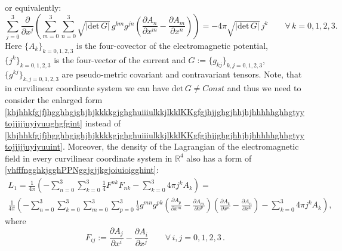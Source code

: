 \documentclass{article}
\theoremstyle{definition}
\theoremstyle{remark}
\newcommand{\er}{\eqref}
\newcommand{\er}{\eqref}
\begin{document}
or equivalently:
\begin{equation}\label{khjhhkfgjfjhgghhgjghjhjkkkkgjghghuiiiulkkjlkklKKgfgjhjjghgjhhjhjhhhhhghhgtyytojjjjjuyiyuughgfghhjkkhjint}
\sum_{j=0}^{3}\frac{\partial}{\partial
x^j}\left(\sum_{m=0}^{3}\sum_{n=0}^{3}\sqrt{|\text{det}\,G|}\,g^{km}g^{jn}\left(\frac{\partial
A_n}{\partial x^m}-\frac{\partial A_m}{\partial x^n}\right)\right)
=-4\pi \sqrt{|\text{det}\,G|}\, j^k\quad\quad\forall\, k=0,1,2,3.
\end{equation}
Here $\{A_k\}_{k=0,1,2,3}$ is the four-covector of the
electromagnetic potential, $\{j^k\}_{k=0,1,2,3}$ is the four-vector
of the current and $G:=\{g_{kj}\}_{k,j=0,1,2,3}$,
$\{g^{kj}\}_{k,j=0,1,2,3}$ are pseudo-metric covariant and
contravariant tensors. Note, that in curvilinear coordinate system
we can have $\text{det}\,G\neq Const$ and thus we need to consider
the enlarged form
\er{khjhhkfgjfjhgghhgjghjhjkkkkgjghghuiiiulkkjlkklKKgfgjhjjghgjhhjhjhhhhhghhgtyytojjjjjuyiyuughgfgint}
instead of
\er{khjhhkfgjfjhgghhgjghjhjkkkkgjghghuiiiulkkjlkklKKgfgjhjjghgjhhjhjhhhhhghhgtyytojjjjjuyiyuuint}.
Moreover, the density of the Lagrangian of the electromagnetic field
in every curvilinear coordinate system in $\mathbb{R}^4$ also has a
form of \er{vhfffngghkjgghPPNggjgjjkgjoiuioigghint}:
\begin{multline}\label{vhfffngghkjgghPPNggjgjjkgjoiuioigghjhhhint}
L_1=\frac{1}{4\pi}\left(-\sum_{n=0}^{3}\sum_{k=0}^{3}\frac{1}{4}F^{nk}F_{nk}-\sum_{k=0}^{3}4\pi
j^k A_k\right)=\\
\frac{1}{4\pi}\left(-\sum_{n=0}^{3}\sum_{k=0}^{3}\sum_{m=0}^{3}\sum_{p=0}^{3}\frac{1}{4}g^{mn}g^{pk}\left(\frac{\partial
A_p}{\partial x^m}-\frac{\partial A_m}{\partial
x^p}\right)\left(\frac{\partial A_k}{\partial x^n}-\frac{\partial
A_n}{\partial x^k}\right)-\sum_{k=0}^{3}4\pi j^k A_k\right),
\end{multline}
where
\begin{equation}\label{huohuioy89gjjhjffffff3478zzrrZZZhjhhjhhjjhhffGGhjjhjhhjhjint}
F_{ij}:=\frac{\partial A_j}{\partial x^i}-\frac{\partial
A_i}{\partial x^j}\quad\quad\forall\, i,j=0,1,2,3\,.
\end{equation}
\end{document}
